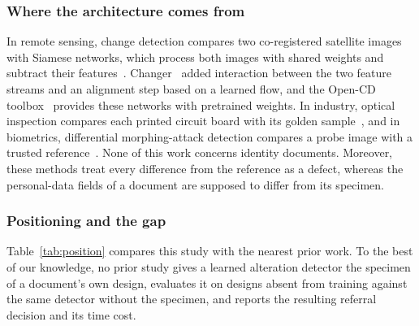 \documentclass[12pt,a4paper]{article}
\begin{document}
\subsubsection{Where the architecture comes from}
In remote sensing, change detection compares two co-registered satellite images with Siamese networks, which process both images with shared weights and subtract their features~\cite{daudt2018fcsiamdiff}. Changer~\cite{fang2023changer} added interaction between the two feature streams and an alignment step based on a learned flow, and the Open-CD toolbox~\cite{li2025opencd} provides these networks with pretrained weights. In industry, optical inspection compares each printed circuit board with its golden sample~\cite{fridman2021changechip}, and in biometrics, differential morphing-attack detection compares a probe image with a trusted reference~\cite{scherhag2020dmad,borghi2021double}. None of this work concerns identity documents. Moreover, these methods treat every difference from the reference as a defect, whereas the personal-data fields of a document are supposed to differ from its specimen.

\subsubsection{Positioning and the gap}
Table~\ref{tab:position} compares this study with the nearest prior work. To the best of our knowledge, no prior study gives a learned alteration detector the specimen of a document's own design, evaluates it on designs absent from training against the same detector without the specimen, and reports the resulting referral decision and its time cost.
\end{document}
